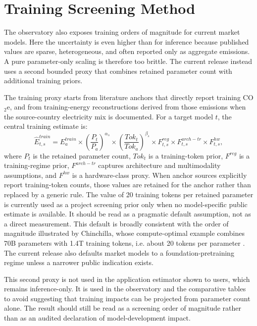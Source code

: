 \documentclass[runningheads]{llncs}
\begin{document}
\section{Training Screening Method}
The observatory also exposes training orders of magnitude for current market models. Here the uncertainty is even higher than for inference because published values are sparse, heterogeneous, and often reported only as aggregate emissions. A pure parameter-only scaling is therefore too brittle. The current release instead uses a second bounded proxy that combines retained parameter count with additional training priors.

The training proxy starts from literature anchors that directly report training CO$_2$e, and from training-energy reconstructions derived from those emissions when the source-country electricity mix is documented. For a target model $t$, the central training estimate is:
\begin{equation}
\hat{E}^{train}_{t,s} = E^{train}_a \times \left(\frac{P_t}{P_a}\right)^{\alpha_s}
\times \left(\frac{Tok_t}{Tok_a}\right)^{\beta_s}
\times F^{reg}_{t,s} \times F^{arch-tr}_{t,s} \times F^{hw}_{t,s},
\end{equation}
where $P_t$ is the retained parameter count, $Tok_t$ is a training-token prior, $F^{reg}$ is a training-regime prior, $F^{arch-tr}$ captures architecture and multimodality assumptions, and $F^{hw}$ is a hardware-class proxy. When anchor sources explicitly report training-token counts, those values are retained for the anchor rather than replaced by a generic rule. The value of 20 training tokens per retained parameter is currently used as a project screening prior only when no model-specific public estimate is available. It should be read as a pragmatic default assumption, not as a direct measurement. This default is broadly consistent with the order of magnitude illustrated by Chinchilla, whose compute-optimal example combines 70B parameters with 1.4T training tokens, i.e. about 20 tokens per parameter \cite{hoffmann2022chinchilla}. The current release also defaults market models to a foundation-pretraining regime unless a narrower public indication exists.

This second proxy is not used in the application estimator shown to users, which remains inference-only. It is used in the observatory and the comparative tables to avoid suggesting that training impacts can be projected from parameter count alone. The result should still be read as a screening order of magnitude rather than as an audited declaration of model-development impact.
\end{document}
